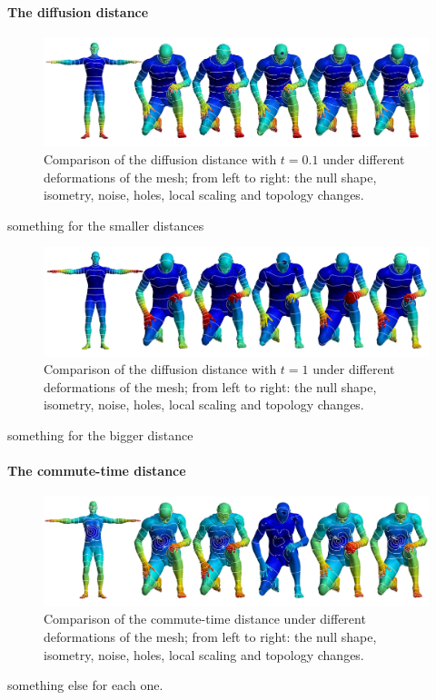 \paragraph{The diffusion distance}
\begin{figure}[h]
	\centering
	\includegraphics[width = \textwidth]{../results/diffusion_small_isolines}
	\caption{Comparison of the diffusion distance with $t = 0.1$ under different deformations of the mesh; from left to right: the null shape, isometry, noise, holes, local scaling and topology changes.}
	\label{fig:diffusion_s_isolines}
\end{figure}
something for the smaller distances

\begin{figure}[h]
	\centering
	\includegraphics[width = \textwidth]{../results/diffusion_big_isolines}
	\caption{Comparison of the diffusion distance with $t = 1$ under different deformations of the mesh; from left to right: the null shape, isometry, noise, holes, local scaling and topology changes.}
	\label{fig:diffusion_b_isolines}
\end{figure}
something for the bigger distance

\paragraph{The commute-time distance}
\begin{figure}[h]
	\centering
	\includegraphics[width = \textwidth]{../results/commute_time_isolines}
	\caption{Comparison of the commute-time distance under different deformations of the mesh; from left to right: the null shape, isometry, noise, holes, local scaling and topology changes.}
	\label{fig:commute_time_isolines}
\end{figure}
something else for each one.

